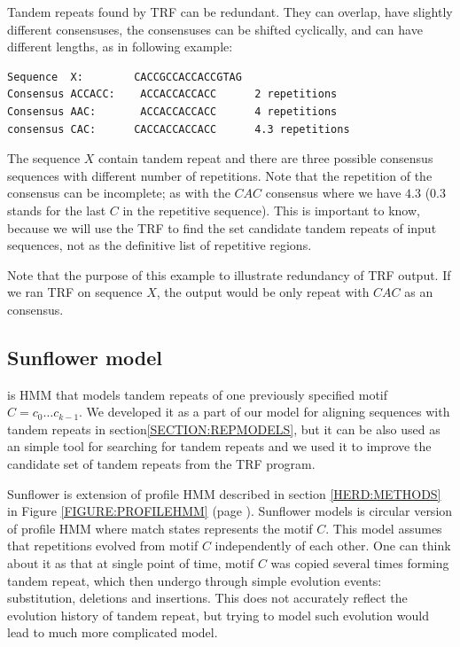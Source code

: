 Tandem repeats found by TRF can be redundant.  They can overlap, have slightly
different consensuses, the consensuses can be shifted cyclically, and can have
different lengths, as in following example:

\begin{verbatim}
Sequence  X:        CACCGCCACCACCGTAG
Consensus ACCACC:    ACCACCACCACC      2 repetitions
Consensus AAC:       ACCACCACCACC      4 repetitions
consensus CAC:      CACCACCACCACC      4.3 repetitions
\end{verbatim}

The sequence $X$ contain tandem repeat and there are three possible consensus
sequences with different number of repetitions. Note that the repetition of the
consensus can be incomplete; as with the $CAC$ consensus where we have $4.3$
($0.3$ stands for the last $C$ in the repetitive sequence). This is important
to know, because we will use the TRF to find the set candidate tandem repeats
of input sequences, not as the definitive list of repetitive regions.

Note that the purpose of this example to illustrate redundancy of TRF output.
If we ran TRF on sequence $X$, the output would be only repeat with $CAC$ as an
consensus.

\subsection{Sunflower model}
 is HMM that models tandem repeats of one
previously specified motif $C=c_0\dots c_{k-1}$. We developed it as a part of
our model for aligning sequences with tandem repeats in
section\ref{SECTION:REPMODELS}, but it can be also used as an simple tool for
searching for tandem repeats and we used it to improve the candidate set of
tandem repeats from the TRF program.

Sunflower is extension of profile HMM described in section \ref{HERD:METHODS}
in Figure \ref{FIGURE:PROFILEHMM} (page \pageref{FIGURE:PROFILEHMM}). Sunflower
models is circular version of profile HMM where match states represents the
motif $C$. This model assumes that repetitions evolved from motif $C$
independently of each other. One can think about it as that at single point of
time, motif $C$ was copied several times forming tandem repeat, which then
undergo through simple evolution events: substitution, deletions and
insertions. This does not accurately reflect the evolution history of tandem
repeat, but trying to model such evolution would lead to much more complicated
model.

